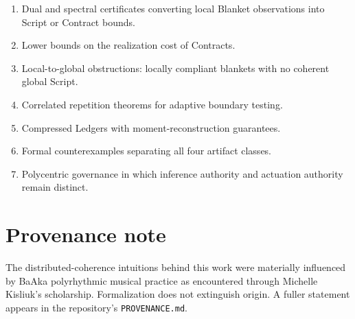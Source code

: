 \documentclass[11pt]{article}
\begin{document}
\begin{enumerate}[leftmargin=*]
\item Dual and spectral certificates converting local Blanket observations into Script or Contract bounds.
\item Lower bounds on the realization cost of Contracts.
\item Local-to-global obstructions: locally compliant blankets with no coherent global Script.
\item Correlated repetition theorems for adaptive boundary testing.
\item Compressed Ledgers with moment-reconstruction guarantees.
\item Formal counterexamples separating all four artifact classes.
\item Polycentric governance in which inference authority and actuation authority remain distinct.
\end{enumerate}

\section*{Provenance note}
The distributed-coherence intuitions behind this work were materially influenced by BaAka polyrhythmic musical practice as encountered through Michelle Kisliuk's scholarship. Formalization does not extinguish origin. A fuller statement appears in the repository's \texttt{PROVENANCE.md}.
\end{document}

